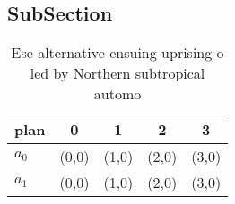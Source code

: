 \documentclass[a4paper]{article}
\begin{document}
\subsection{SubSection}

\begin{table}
\begin{adjustbox}{width=0.5\columnwidth}
\begin{tabular}{|l|l|l|l|l|}
\hline
\textbf{plan} & \multicolumn{1}{c|}{\textbf{0}} & \multicolumn{1}{c|}{\textbf{1}} & \multicolumn{1}{c|}{\textbf{2}} & \multicolumn{1}{c|}{\textbf{3}} \\ \hline
\textbf{$a_0$}  & (0,0) & (1,0) & (2,0) & (3,0) \\ \hline
\textbf{$a_1$}  & (0,0) & (1,0) & (2,0) & (3,0) \\ \hline
\end{tabular}
\end{adjustbox}
\caption{Ese alternative ensuing uprising o led by Northern subtropical automo
}
\end{table}
\end{document}
